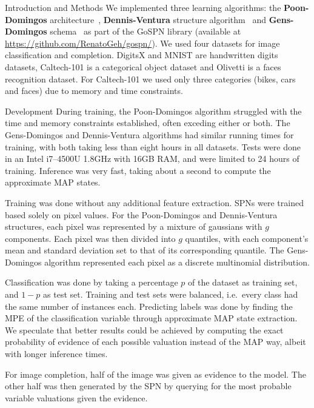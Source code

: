 \documentclass[final,hyperref={pdfpagelabels=false},notheorems]{beamer}
\theoremstyle{thesisstyle}
\newcommand{\pskip}{\vskip 0.5cm}
\begin{document}
\begin{frame}[t]
\begin{columns}[t]
\begin{column}{.5225\textwidth}
\begin{block}{Introduction and Methods}
      We implemented three learning algorithms: the \textbf{Poon-Domingos}
      architecture~\cite{poon-domingos}, \textbf{Dennis-Ventura} structure algorithm~\cite{clustering} and
      \textbf{Gens-Domingos} schema~\cite{gens-domingos} as part of the GoSPN library (available at
      \url{https://github.com/RenatoGeh/gospn/}). We used four datasets for image classification
      and completion. DigitsX and MNIST are handwritten digits datasets, Caltech-101 is a
      categorical object dataset and Olivetti is a faces recognition dataset. For Caltech-101 we
      used only three categories (bikes, cars and faces) due to memory and time constraints.
    \end{block}

    \begin{block}{Development}
      During training, the Poon-Domingos algorithm struggled with the time and memory constraints
      established, often exceding either or both. The Gens-Domingos and Dennis-Ventura algorithms
      had similar running times for training, with both taking less than eight hours in all
      datasets. Tests were done in an Intel i7--4500U 1.8GHz with 16GB RAM, and were limited to 24
      hours of training. Inference was very fast, taking about a second to compute the approximate
      MAP states.\pskip

      Training was done without any additional feature extraction. SPNs were trained based solely
      on pixel values. For the Poon-Domingos and Dennis-Ventura structures, each pixel was
      represented by a mixture of gaussians with $g$ components. Each pixel was then divided into
      $g$ quantiles, with each component's mean and standard deviation set to that of its
      corresponding quantile. The Gens-Domingos algorithm represented each pixel as a discrete
      multinomial distribution.\pskip

      Classification was done by taking a percentage $p$ of the dataset as training set, and $1-p$
      as test set. Training and test sets were balanced, i.e.\ every class had the same number of
      instances each. Predicting labels was done by finding the MPE of the classification variable
      through approximate MAP state extraction. We speculate that better results could be achieved
      by computing the exact probability of evidence of each possible valuation instead of the MAP
      way, albeit with longer inference times.\pskip

      For image completion, half of the image was given as evidence to the model. The other half
      was then generated by the SPN by querying for the most probable variable valuations given the
      evidence.
    \end{block}


\end{column}
\end{columns}
\end{frame}
\end{document}
